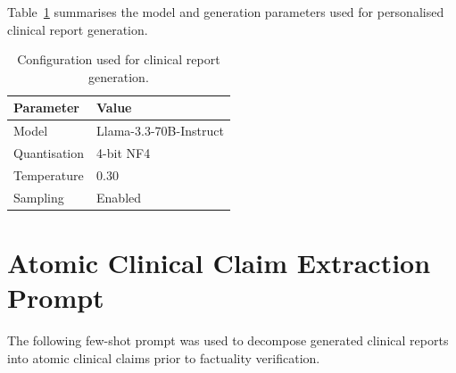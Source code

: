 \documentclass[ %
                    author={Aman Kumar Singh},
                supervisor={Dr. Edwin Simpson},
                    degree={MSc},
                     title={Quality-Aware Knowledge Distillation of Large Language Models for Efficient Personalised Clinical Report Generation},
                  subtitle={},
                      type={},
                      year={2021}]{dissertation}
\begin{document}
Table~\ref{tab:report_generation_config} summarises the model and generation parameters used for personalised clinical report generation.


\begin{table}[htbp]
\centering
\caption{Configuration used for clinical report generation.}
\label{tab:report_generation_config}
\begin{tabular}{ll}
\hline
\textbf{Parameter} & \textbf{Value} \\
\hline
Model & Llama-3.3-70B-Instruct \\
Quantisation & 4-bit NF4 \\
Temperature & 0.30 \\
Sampling & Enabled \\
\hline
\end{tabular}
\end{table}

\chapter{Atomic Clinical Claim Extraction Prompt}
\label{appx:factuality_claim_prompt}

The following few-shot prompt was used to decompose generated clinical
reports into atomic clinical claims prior to factuality verification.
\end{document}
